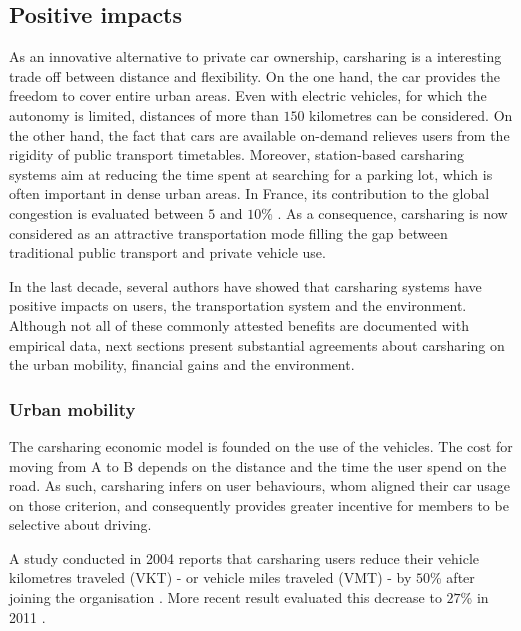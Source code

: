 \begin{bibunit}[ieeetr]
\subsection{Positive impacts}
As an innovative alternative to private car ownership, carsharing is a interesting trade off between distance and flexibility.
On the one hand, the car provides the freedom to cover entire urban areas.
Even with electric vehicles, for which the autonomy is limited, distances of more than $150$ kilometres can be considered.
On the other hand, the fact that cars are available on-demand relieves users from the rigidity of public transport timetables.
Moreover, station-based carsharing systems aim at reducing the time spent at searching for a parking lot, which is often important in dense urban areas.
In France, its contribution to the global congestion is evaluated between $5$ and $10$\%  \cite{stationnement_intelligent_cerema}.
As a consequence, carsharing is now considered as an attractive transportation mode filling the gap between traditional public transport and private vehicle use.

\medskip
In the last decade, several authors have showed that carsharing systems have positive impacts on users, the transportation system and the environment.
Although not all of these commonly attested benefits are documented with empirical data, next sections present substantial agreements about carsharing on the urban mobility, financial gains and the environment.


\subsubsection{Urban mobility}

The carsharing economic model is founded on the use of the vehicles.
The cost for moving from A to B depends on the distance and the time the user spend on the road.
As such, carsharing infers on user behaviours, whom aligned their car usage on those criterion, and consequently provides greater incentive for members to be selective about driving.

A study conducted in 2004 reports that carsharing users reduce their vehicle kilometres traveled (VKT) - or vehicle miles traveled (VMT) - by $50$\% after joining the organisation \cite{cervero_city_2004}.
More recent result evaluated this decrease to $27$\% in 2011 \cite{martin_greenhouse_2011}.



\end{bibunit}
